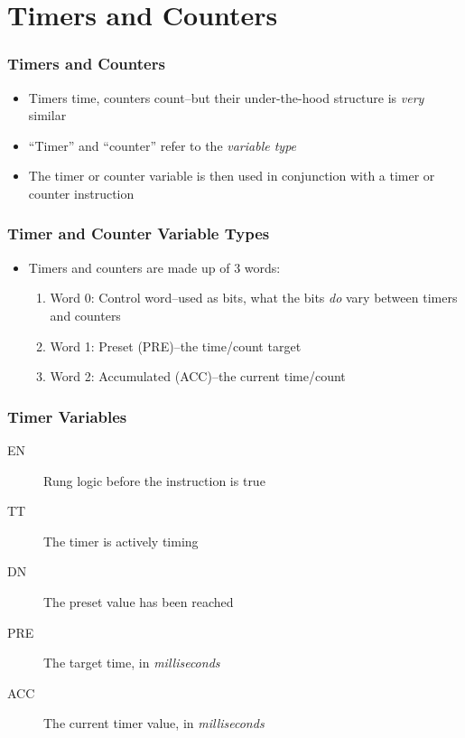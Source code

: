 \section{Timers and Counters}

\begin{frame}
    \frametitle{Timers and Counters}

    \begin{itemize}
        \item Timers time, counters count--but their under-the-hood structure is \emph{very} similar
        \item ``Timer'' and ``counter'' refer to the \emph{variable type}
        \item The timer or counter variable is then used in conjunction with a timer or counter instruction
    \end{itemize}
\end{frame}

\begin{frame}
    \frametitle{Timer and Counter Variable Types}

    \begin{itemize}
        \item Timers and counters are made up of 3 words:
        \begin{enumerate}
            \item Word 0: Control word--used as bits, what the bits \emph{do} vary between timers and counters
            \item Word 1: Preset (PRE)--the time/count target
            \item Word 2: Accumulated (ACC)--the current time/count
        \end{enumerate}
    \end{itemize}
\end{frame}

\begin{frame}
    \frametitle{Timer Variables}

    \begin{description}
        \item[EN] Rung logic before the instruction is true
        \item[TT] The timer is actively timing
        \item[DN] The preset value has been reached
        \item[PRE] The target time, in \emph{milliseconds}
        \item[ACC] The current timer value, in \emph{milliseconds} 
    \end{description}
\end{frame}

